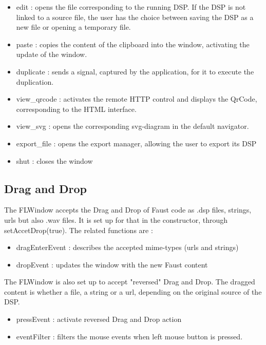 \documentclass[a4paper]{article}
\begin{document}
\begin{itemize}
\item edit : opens the file corresponding to the running DSP. If the DSP is not linked to a source file, the user has the choice between saving the DSP as a new file or opening a temporary file. 
\item paste : copies the content of the clipboard into the window, activating the update of the window.
\item duplicate : sends a signal, captured by the application, for it to execute the duplication. 
\item view\_qrcode : activates the remote HTTP control and displays the QrCode, corresponding to the HTML interface.
\item view\_svg : opens the corresponding svg-diagram in the default navigator.
\item export\_file : opens the export manager, allowing the user to export its DSP
\item shut : closes the window
\end{itemize}

\subsection{Drag and Drop}

The FLWindow accepts the Drag and Drop of Faust code as .dsp files, strings, urls but also .wav files. It is set up for that in the constructor, through setAccetDrop(true). The related functions are :

\begin{itemize}
\item dragEnterEvent : describes the accepted mime-types (urls and strings) 
\item dropEvent : updates the window with the new Faust content
\end{itemize}

The FLWindow is also set up to accept "reversed" Drag and Drop. The dragged content is whether a file, a string or a url, depending on the original source of the DSP. 

\begin{itemize}
\item pressEvent : activate reversed Drag and Drop action
\item eventFilter : filters the mouse events when left mouse button is pressed.
\end{itemize}

\end{document}
